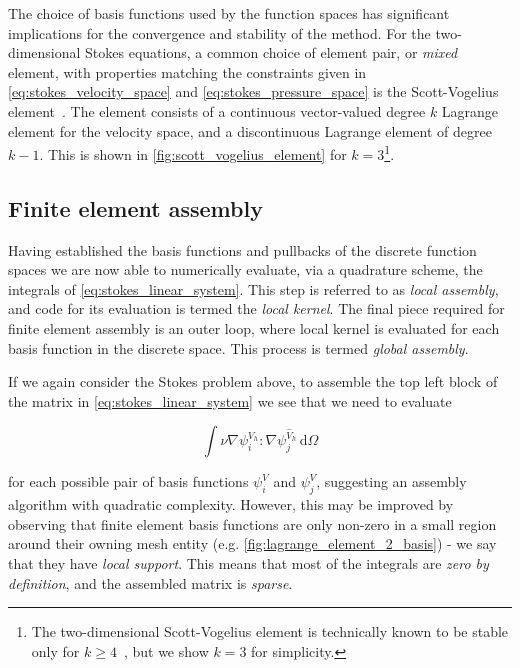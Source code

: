 \documentclass[thesis]{subfiles}
\begin{document}
The choice of basis functions used by the function spaces has significant implications for the convergence and stability of the method.
For the two-dimensional Stokes equations, a common choice of element pair, or \textit{mixed} element, with properties matching the constraints given in \cref{eq:stokes_velocity_space} and \cref{eq:stokes_pressure_space} is the Scott-Vogelius element~\cite{scottNormEstimatesMaximal1985}.
The element consists of a continuous vector-valued degree $k$ Lagrange element for the velocity space, and a discontinuous Lagrange element of degree $k-1$.
This is shown in \cref{fig:scott_vogelius_element} for $k = 3$\footnote{The two-dimensional Scott-Vogelius element is technically known to be stable only for $k \geq 4$~\cite{guzmanScottVogeliusFiniteElements2018}, but we show $k = 3$ for simplicity.}.

\subsection{Finite element assembly}

Having established the basis functions and pullbacks of the discrete function spaces we are now able to numerically evaluate, via a quadrature scheme, the integrals of \cref{eq:stokes_linear_system}.
This step is referred to as \textit{local assembly}, and code for its evaluation is termed the \textit{local kernel}.
The final piece required for finite element assembly is an outer loop, where local kernel is evaluated for each basis function in the discrete space.
This process is termed \textit{global assembly}.

If we again consider the Stokes problem above, to assemble the top left block of the matrix in \cref{eq:stokes_linear_system} we see that we need to evaluate

\begin{equation}
  \int \nu \nabla \psi^{V_h}_i : \nabla \psi^{\hat V_h}_j \, \textrm{d}\Omega
  \label{eq:stokes_top_left}
\end{equation}

\noindent
for each possible pair of basis functions $\psi^V_i$ and $\psi^V_j$, suggesting an assembly algorithm with quadratic complexity.
However, this may be improved by observing that finite element basis functions are only non-zero in a small region around their owning mesh entity (e.g. \cref{fig:lagrange_element_2_basis}) - we say that they have \textit{local support}.
This means that most of the integrals are \textit{zero by definition}, and the assembled matrix is \textit{sparse}.
\end{document}
